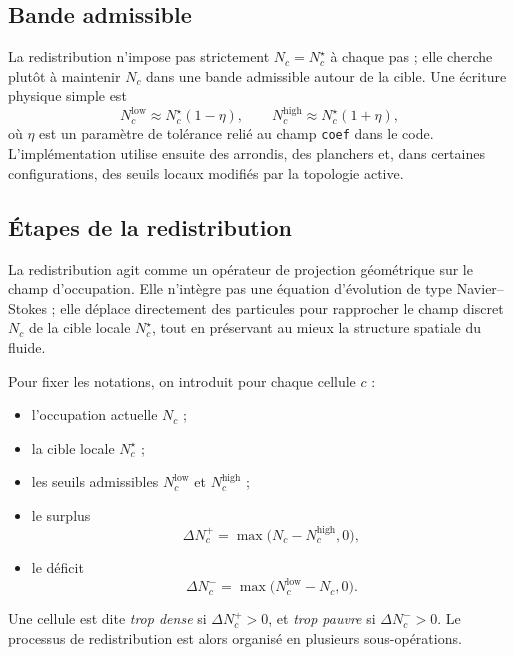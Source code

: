 \documentclass[11pt,a4paper]{article}
\begin{document}
\subsection{Bande admissible}

La redistribution n'impose pas strictement $N_c=N_c^{\star}$ à chaque pas ; elle cherche plutôt à maintenir $N_c$ dans une bande admissible autour de la cible. Une écriture physique simple est
\begin{equation}
 N_c^{\mathrm{low}} \approx N_c^{\star}(1-\eta),
\qquad
 N_c^{\mathrm{high}} \approx N_c^{\star}(1+\eta),
\end{equation}
où $\eta$ est un paramètre de tolérance relié au champ \verb|coef| dans le code. L'implémentation utilise ensuite des arrondis, des planchers et, dans certaines configurations, des seuils locaux modifiés par la topologie active.

\subsection{Étapes de la redistribution}

La redistribution agit comme un opérateur de projection géométrique sur le champ d'occupation. Elle n'intègre pas une équation d'évolution de type Navier--Stokes ; elle déplace directement des particules pour rapprocher le champ discret $N_c$ de la cible locale $N_c^{\star}$, tout en préservant au mieux la structure spatiale du fluide.

Pour fixer les notations, on introduit pour chaque cellule $c$ :
\begin{itemize}
  \item l'occupation actuelle $N_c$ ;
  \item la cible locale $N_c^{\star}$ ;
  \item les seuils admissibles $N_c^{\mathrm{low}}$ et $N_c^{\mathrm{high}}$ ;
  \item le surplus
  \begin{equation}
    \Delta N_c^{+} = \max\bigl(N_c - N_c^{\mathrm{high}}, 0\bigr),
  \end{equation}
  \item le déficit
  \begin{equation}
    \Delta N_c^{-} = \max\bigl(N_c^{\mathrm{low}} - N_c, 0\bigr).
  \end{equation}
\end{itemize}

Une cellule est dite \emph{trop dense} si $\Delta N_c^{+}>0$, et \emph{trop pauvre} si $\Delta N_c^{-}>0$. Le processus de redistribution est alors organisé en plusieurs sous-opérations.
\end{document}
